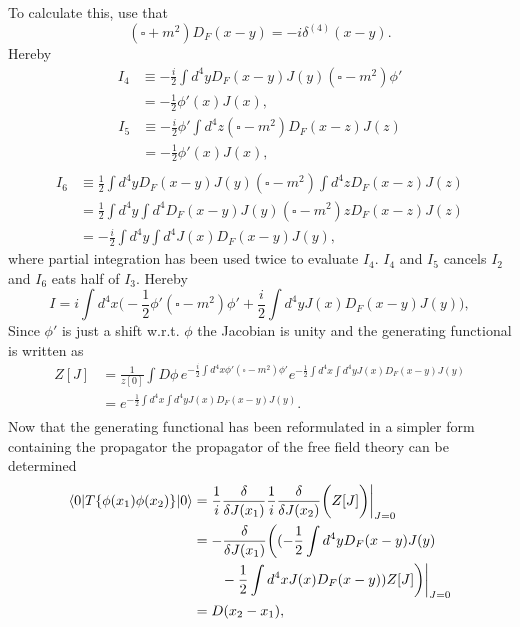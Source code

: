 To calculate this, use that
\begin{equation}
	(\square+m^2)D_F(x-y)=-i\delta^{(4)}(x-y).
\end{equation} 
Hereby
\begin{equation}
	\begin{split}
		I_4&\equiv -\frac{i}{2}\int d^4y D_F(x-y)J(y)(\square-m^2)\phi'\\
		&=-\frac{1}{2}\phi'(x)J(x),
	\end{split}
\end{equation} 
\begin{equation}
	\begin{split}
		I_5&\equiv -\frac{i}{2}\phi'\int d^4z (\square-m^2)D_F(x-z)J(z)\\
		&=-\frac{1}{2}\phi'(x)J(x),\\
	\end{split}
\end{equation} 
\begin{equation}
	\begin{split}
		I_6&\equiv \frac{1}{2}\int d^4y D_F(x-y)J(y)(\square-m^2)\int d^4z D_F(x-z)J(z)\\
		&=\frac{1}{2}\int d^4y\int d^4 D_F(x-y)J(y)(\square-m^2)z D_F(x-z)J(z)\\
		&=-\frac{i}{2}\int d^4y\int d^4 J(x)D_F(x-y)J(y),
	\end{split}
\end{equation}  
where partial integration has been used twice to evaluate $I_4$. $I_4$ and $I_5$ cancels $I_2$ and $I_6$ eats half of $I_3$. Hereby
\begin{equation}
		I=i\int d^4x\bigg(-\frac{1}{2}\phi'(\square-m^2)\phi'+\frac{i}{2}\int d^4yJ(x) D_F(x-y)J(y)\bigg),
\end{equation} 	
Since $\phi'$ is just a shift w.r.t. $\phi$ the Jacobian is unity and the generating functional is written as
\begin{equation}
	\begin{split}
		Z[J]&=\frac{1}{z[0]}\int D\phi \, e^{-\frac{i}{2}\int d^4x\phi'(\square-m^2)\phi'}e^{-\frac{1}{2}\int d^4x\int d^4yJ(x) D_F(x-y)J(y)}\\
		&=e^{-\frac{1}{2}\int d^4x\int d^4yJ(x) D_F(x-y)J(y)}.\\
	\end{split}
\end{equation} 		
Now that the generating functional has been reformulated in a simpler form containing the propagator the propagator of the free field theory can be determined
 \begin{equation}
	\begin{split}
		\braket{0|T\{\phi(x_1)\phi(x_2)\}|0}&=\frac{1}{i}\frac{\delta }{\delta J(x_1)}\frac{1}{i}\frac{\delta }{\delta J(x_2)}\bigg(Z[J]\bigg)\bigg|_{J=0}\\
		&=-\frac{\delta}{\delta J(x_1)}\bigg((-\frac{1}{2}\int d^4yD_F(x-y)J(y)\\
		&\qquad-\frac{1}{2}\int d^4x J(x)D_F(x-y))Z[J]\bigg)\bigg|_{J=0}\\
		&=D(x_2-x_1),
	\end{split}
\end{equation} 

